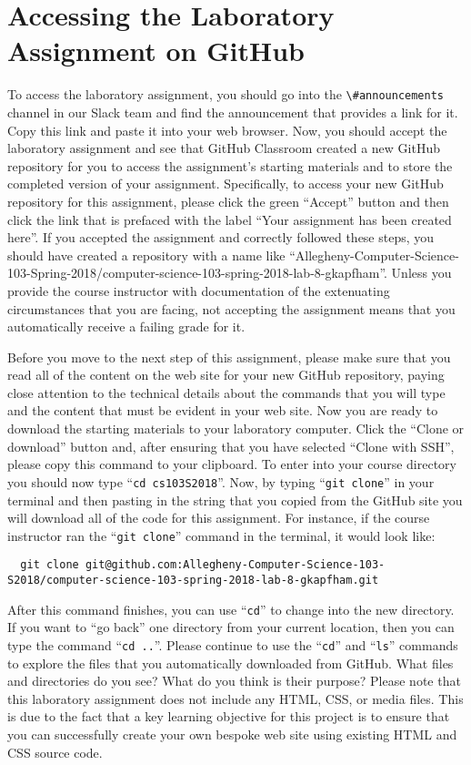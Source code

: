 \documentclass[11pt]{article}
\newcommand{\command}[1]{``\lstinline{#1}''}
\newcommand{\channel}[1]{\lstinline{#1}}
\newcommand{\step}[1]{``{#1}''}
\begin{document}
\section*{Accessing the Laboratory Assignment on GitHub}

To access the laboratory assignment, you should go into the
\channel{\#announcements} channel in our Slack team and find the announcement
that provides a link for it. Copy this link and paste it into your web browser.
Now, you should accept the laboratory assignment and see that GitHub Classroom
created a new GitHub repository for you to access the assignment's starting
materials and to store the completed version of your assignment. Specifically,
to access your new GitHub repository for this assignment, please click the green
``Accept'' button and then click the link that is prefaced with the label ``Your
assignment has been created here''. If you accepted the assignment and correctly
followed these steps, you should have created a repository with a name like
``Allegheny-Computer-Science-103-Spring-2018/computer-science-103-spring-2018-lab-8-gkapfham''.
Unless you provide the course instructor with documentation of the extenuating
circumstances that you are facing, not accepting the assignment means that you
automatically receive a failing grade for it.

Before you move to the next step of this assignment, please make sure that you
read all of the content on the web site for your new GitHub repository, paying
close attention to the technical details about the commands that you will type
and the content that must be evident in your web site. Now you are ready to
download the starting materials to your laboratory computer. Click the ``Clone
or download'' button and, after ensuring that you have selected ``Clone with
SSH'', please copy this command to your clipboard. To enter into your course
directory you should now type \command{cd cs103S2018}. Now, by typing
\command{git clone} in your terminal and then pasting in the string that you
copied from the GitHub site you will download all of the code for this
assignment. For instance, if the course instructor ran the \command{git clone}
command in the terminal, it would look like:

\begin{lstlisting}
  git clone git@github.com:Allegheny-Computer-Science-103-S2018/computer-science-103-spring-2018-lab-8-gkapfham.git
\end{lstlisting}

After this command finishes, you can use \command{cd} to change into the new
directory. If you want to \step{go back} one directory from your current
location, then you can type the command \command{cd ..}. Please continue to use
the \command{cd} and \command{ls} commands to explore the files that you
automatically downloaded from GitHub. What files and directories do you see?
What do you think is their purpose? Please note that this laboratory assignment
does not include any HTML, CSS, or media files. This is due to the fact that a
key learning objective for this project is to ensure that you can successfully
create your own bespoke web site using existing HTML and CSS source code.
\end{document}
